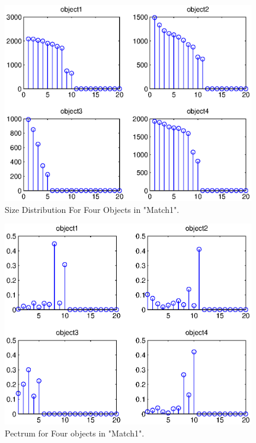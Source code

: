 \documentclass[paper=a4, fontsize=11pt]{scrartcl}
\begin{document}
\begin{figure}
	\centering
	\includegraphics[width=11cm]{size_distribution_for_4object.eps}
	\caption{Size Distribution For Four Objects in "Match1". }
	\label{fig:17}
\end{figure}




\begin{figure}
	\centering
	\includegraphics[width=11cm]{pecstrum_for_4object.eps}
	\caption{Pectrum for Four objects in "Match1".  }
	\label{fig:18}
\end{figure}
\end{document}
